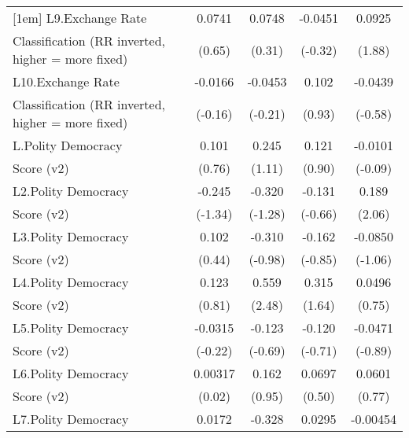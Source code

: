 {\begin{tabular}{l*{4}{c}}
[1em]
L9.Exchange Rate    &      0.0741         &      0.0748         &     -0.0451         &      0.0925         \\
Classification (RR inverted, higher = more fixed)&      (0.65)         &      (0.31)         &     (-0.32)         &      (1.88)         \\
[1em]
L10.Exchange Rate   &     -0.0166         &     -0.0453         &       0.102         &     -0.0439         \\
Classification (RR inverted, higher = more fixed)&     (-0.16)         &     (-0.21)         &      (0.93)         &     (-0.58)         \\
[1em]
L.Polity Democracy  &       0.101         &       0.245         &       0.121         &     -0.0101         \\
Score (v2)          &      (0.76)         &      (1.11)         &      (0.90)         &     (-0.09)         \\
[1em]
L2.Polity Democracy &      -0.245         &      -0.320         &      -0.131         &       0.189\sym{*}  \\
Score (v2)          &     (-1.34)         &     (-1.28)         &     (-0.66)         &      (2.06)         \\
[1em]
L3.Polity Democracy &       0.102         &      -0.310         &      -0.162         &     -0.0850         \\
Score (v2)          &      (0.44)         &     (-0.98)         &     (-0.85)         &     (-1.06)         \\
[1em]
L4.Polity Democracy &       0.123         &       0.559\sym{*}  &       0.315         &      0.0496         \\
Score (v2)          &      (0.81)         &      (2.48)         &      (1.64)         &      (0.75)         \\
[1em]
L5.Polity Democracy &     -0.0315         &      -0.123         &      -0.120         &     -0.0471         \\
Score (v2)          &     (-0.22)         &     (-0.69)         &     (-0.71)         &     (-0.89)         \\
[1em]
L6.Polity Democracy &     0.00317         &       0.162         &      0.0697         &      0.0601         \\
Score (v2)          &      (0.02)         &      (0.95)         &      (0.50)         &      (0.77)         \\
[1em]
L7.Polity Democracy &      0.0172         &      -0.328         &      0.0295         &    -0.00454         \\

\end{tabular}}
